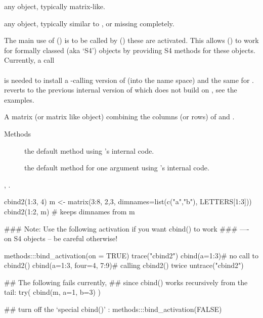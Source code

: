 %
\begin{Arguments}
\begin{ldescription}
\item[\code{x}] any \R{} object, typically matrix-like.
\item[\code{y}] any \R{} object, typically similar to , or missing
completely.
\end{ldescription}
\end{Arguments}
%
\begin{Details}\relax
The main use of  () is to be called by
  ()
 these are activated.  This allows 
() to work for formally classed (aka `S4')
objects by providing S4 methods for these objects.  Currently, a call\\{}
\\{}
is needed to install a
-calling version of  (into the
 name space) and the same for .\\{}
 reverts to the
previous internal version of  which does not build on
, see the examples.
\end{Details}
%
\begin{Value}
A matrix (or matrix like object) combining the columns (or rows) of
 and .
\end{Value}
%
\begin{Section}{Methods}
\begin{description}

\item[] the default method
using \R{}'s internal code.
\item[] the default method
for one argument using \R{}'s internal code.

\end{description}

\end{Section}
%
\begin{SeeAlso}\relax
{}, .
\end{SeeAlso}
%
\begin{Examples}
\begin{ExampleCode}
cbind2(1:3, 4)
m <- matrix(3:8, 2,3, dimnames=list(c("a","b"), LETTERS[1:3]))
cbind2(1:2, m) # keeps dimnames from m

### Note: Use the following activation if you want cbind() to work
### ----  on S4 objects -- be careful otherwise!

methods:::bind_activation(on = TRUE)
trace("cbind2")
cbind(a=1:3)# no call to cbind2()
cbind(a=1:3, four=4, 7:9)# calling cbind2() twice
untrace("cbind2")



## The following fails currently,
## since cbind() works recursively from the tail:
try( cbind(m, a=1, b=3) )

## turn off the `special cbind()' :
methods:::bind_activation(FALSE)
\end{ExampleCode}
\end{Examples}
